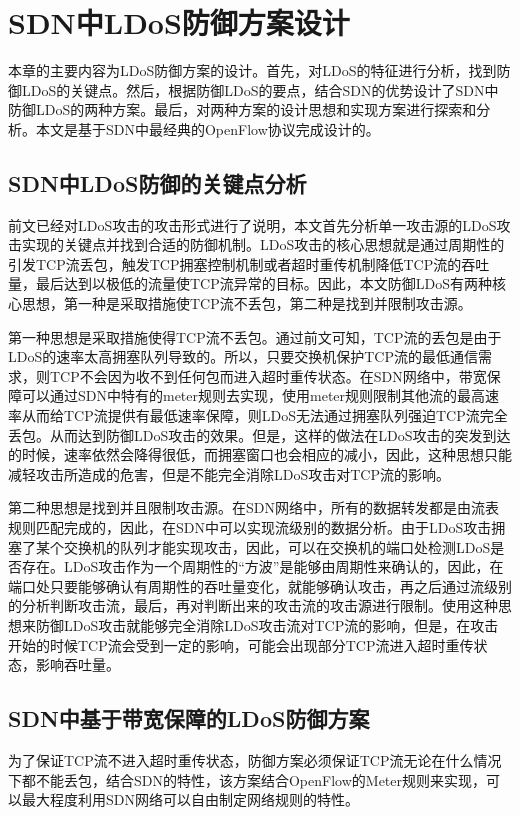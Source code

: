 \chapter{SDN中LDoS防御方案设计}
\label{cha:design}
本章的主要内容为LDoS防御方案的设计。首先，对LDoS的特征进行分析，找到防御LDoS的关键点。然后，根据防御LDoS的要点，结合SDN的优势设计了SDN中防御LDoS的两种方案。最后，对两种方案的设计思想和实现方案进行探索和分析。本文是基于SDN中最经典的OpenFlow协议完成设计的。

\section{SDN中LDoS防御的关键点分析}
\label{chap4:keyanalysis}
前文已经对LDoS攻击的攻击形式进行了说明，本文首先分析单一攻击源的LDoS攻击实现的关键点并找到合适的防御机制。LDoS攻击的核心思想就是通过周期性的引发TCP流丢包，触发TCP拥塞控制机制或者超时重传机制降低TCP流的吞吐量，最后达到以极低的流量使TCP流异常的目标。因此，本文防御LDoS有两种核心思想，第一种是采取措施使TCP流不丢包，第二种是找到并限制攻击源。

第一种思想是采取措施使得TCP流不丢包。通过前文可知，TCP流的丢包是由于LDoS的速率太高拥塞队列导致的。所以，只要交换机保护TCP流的最低通信需求，则TCP不会因为收不到任何包而进入超时重传状态。在SDN网络中，带宽保障可以通过SDN中特有的meter规则去实现，使用meter规则限制其他流的最高速率从而给TCP流提供有最低速率保障，则LDoS无法通过拥塞队列强迫TCP流完全丢包。从而达到防御LDoS攻击的效果。但是，这样的做法在LDoS攻击的突发到达的时候，速率依然会降得很低，而拥塞窗口也会相应的减小，因此，这种思想只能减轻攻击所造成的危害，但是不能完全消除LDoS攻击对TCP流的影响。

第二种思想是找到并且限制攻击源。在SDN网络中，所有的数据转发都是由流表规则匹配完成的，因此，在SDN中可以实现流级别的数据分析。由于LDoS攻击拥塞了某个交换机的队列才能实现攻击，因此，可以在交换机的端口处检测LDoS是否存在。LDoS攻击作为一个周期性的“方波”是能够由周期性来确认的，因此，在端口处只要能够确认有周期性的吞吐量变化，就能够确认攻击，再之后通过流级别的分析判断攻击流，最后，再对判断出来的攻击流的攻击源进行限制。使用这种思想来防御LDoS攻击就能够完全消除LDoS攻击流对TCP流的影响，但是，在攻击开始的时候TCP流会受到一定的影响，可能会出现部分TCP流进入超时重传状态，影响吞吐量。

\section{SDN中基于带宽保障的LDoS防御方案}
\label{chap4:bandguatee}

为了保证TCP流不进入超时重传状态，防御方案必须保证TCP流无论在什么情况下都不能丢包，结合SDN的特性，该方案结合OpenFlow的Meter规则来实现，可以最大程度利用SDN网络可以自由制定网络规则的特性。

